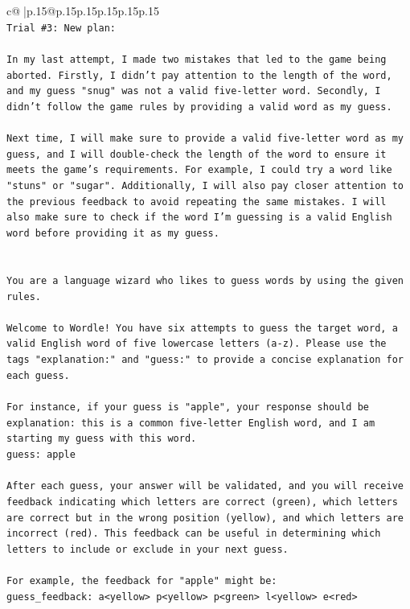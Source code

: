\documentclass{article}
\begin{document}
{\begin{supertabular}{c@{$\;$}|p{.15\linewidth}@{}p{.15\linewidth}p{.15\linewidth}p{.15\linewidth}p{.15\linewidth}p{.15\linewidth}}
{{{\\ 
\texttt{Trial \#3: New plan: } \\
\\ 
\texttt{In my last attempt, I made two mistakes that led to the game being aborted. Firstly, I didn't pay attention to the length of the word, and my guess "snug" was not a valid five{-}letter word. Secondly, I didn't follow the game rules by providing a valid word as my guess. } \\
\\ 
\texttt{Next time, I will make sure to provide a valid five{-}letter word as my guess, and I will double{-}check the length of the word to ensure it meets the game's requirements. For example, I could try a word like "stuns" or "sugar". Additionally, I will also pay closer attention to the previous feedback to avoid repeating the same mistakes. I will also make sure to check if the word I'm guessing is a valid English word before providing it as my guess.} \\
\\ 
\\ 
\texttt{You are a language wizard who likes to guess words by using the given rules.} \\
\\ 
\texttt{Welcome to Wordle! You have six attempts to guess the target word, a valid English word of five lowercase letters (a{-}z). Please use the tags "explanation:" and "guess:" to provide a concise explanation for each guess.} \\
\\ 
\texttt{For instance, if your guess is "apple", your response should be} \\
\texttt{explanation: this is a common five{-}letter English word, and I am starting my guess with this word.} \\
\texttt{guess: apple} \\
\\ 
\texttt{After each guess, your answer will be validated, and you will receive feedback indicating which letters are correct (green), which letters are correct but in the wrong position (yellow), and which letters are incorrect (red). This feedback can be useful in determining which letters to include or exclude in your next guess.} \\
\\ 
\texttt{For example, the feedback for "apple" might be:} \\
\texttt{guess\_feedback: a<yellow> p<yellow> p<green> l<yellow> e<red>} \\
}}}
\end{supertabular}}
\end{document}

